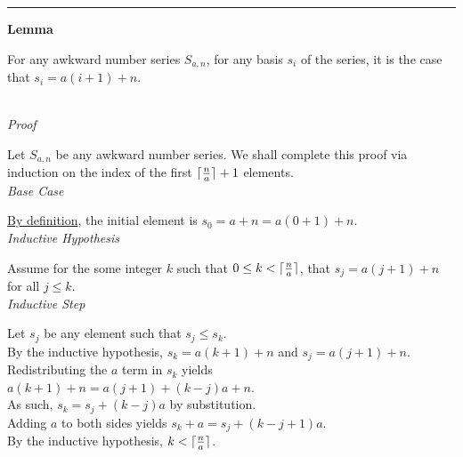 \documentclass[a4paper,12pt]{article}
\DeclarePairedDelimiter{\ceil}{\lceil}{\rceil}
\begin{document}
\begin{center}
\noindent\rule{8cm}{0.4pt}
\end{center}








\label{lemma:basis_lengths}
\hypertarget{lemma:basis_lengths}{}
\begin{tcolorbox}
\textbf{Lemma}

For any awkward number series $S_{a,n}$, for any basis $s_i$ of the series, it is the case that $s_i = a(i + 1) + n$.
\end{tcolorbox}

\noindent \\
\textit{Proof}

\noindent Let $S_{a,n}$ be any awkward number series. We shall complete this proof via induction on the index of the first $\ceil{\frac{n}{a}} + 1$ elements.\\


\noindent
\textit{Base Case}

\noindent \hyperlink{definition:awkward_number_series}{By definition}, the initial element is $s_0 = a + n = a(0 + 1) + n$.\\


\noindent
\textit{Inductive Hypothesis}

\noindent Assume for the some integer $k$ such that $0 \leq k < \ceil{\frac{n}{a}}$, that $s_j = a(j + 1) + n$ for all $j \leq k$.\\

\noindent
\textit{Inductive Step}

\noindent Let $s_j$ be any element such that $s_j \leq s_k$.\\

\noindent By the inductive hypothesis, $s_k = a(k + 1) + n$ and $s_j = a(j + 1) + n$.\\

\noindent Redistributing the $a$ term in $s_k$ yields $a(k + 1) + n = a(j + 1) + (k - j)a + n$.\\

\noindent As such, $s_k = s_j + (k - j)a$ by substitution.\\

\noindent Adding $a$ to both sides yields $s_k + a = s_j + (k - j + 1)a$.\\

\noindent By the inductive hypothesis, $k < \ceil{\frac{n}{a}}$.\\
\end{document}
